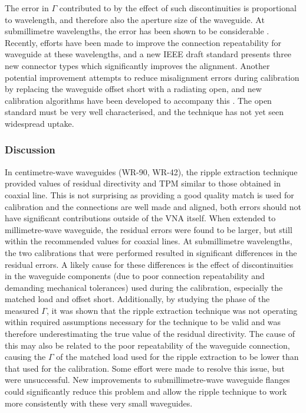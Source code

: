 \documentclass[../thesis/thesis.tex]{subfiles}
\begin{document}
The error in $\Gamma$ contributed to by the effect of such discontinuities is proportional to wavelength, and therefore also the aperture size of the waveguide. At submillimetre wavelengths, the error has been shown to be considerable \cite{Williams_2011, Li_2012}. Recently, efforts have been made to improve the connection repeatability for waveguide at these wavelengths, and a new IEEE draft standard \cite{IEEE1785} presents three new connector types which significantly improves the alignment. Another potential improvement attempts to reduce misalignment errors during calibration by replacing the waveguide offset short with a radiating open, and new calibration algorithms have been developed to accompany this \cite{Arsenovic_2014}. The open standard must be very well characterised, and the technique has not yet seen widespread uptake.

\subsubsection{Discussion}

In centimetre-wave waveguides (WR-90, WR-42), the ripple extraction technique provided values of residual directivity and TPM similar to those obtained in coaxial line. This is not surprising as providing a good quality match is used for calibration and the connections are well made and aligned, both errors should not have significant contributions outside of the VNA itself. When extended to millimetre-wave waveguide, the residual errors were found to be larger, but still within the recommended values for coaxial lines. At submillimetre wavelengths, the two calibrations that were performed resulted in significant differences in the residual errors. A likely cause for these differences is the effect of discontinuities in the waveguide components (due to poor connection repeatability and demanding mechanical tolerances) used during the calibration, especially the matched load and offset short. Additionally, by studying the phase of the measured $\Gamma$, it was shown that the ripple extraction technique was not operating within required assumptions necessary for the technique to be valid and was therefore underestimating the true value of the residual directivity. The cause of this may also be related to the poor repeatability of the waveguide connection, causing the $\Gamma$ of the matched load used for the ripple extraction to be lower than that used for the calibration. Some effort were made to resolve this issue, but were unsuccessful. New improvements to submillimetre-wave waveguide flanges could significantly reduce this problem and allow the ripple technique to work more consistently with these very small waveguides.
\end{document}
